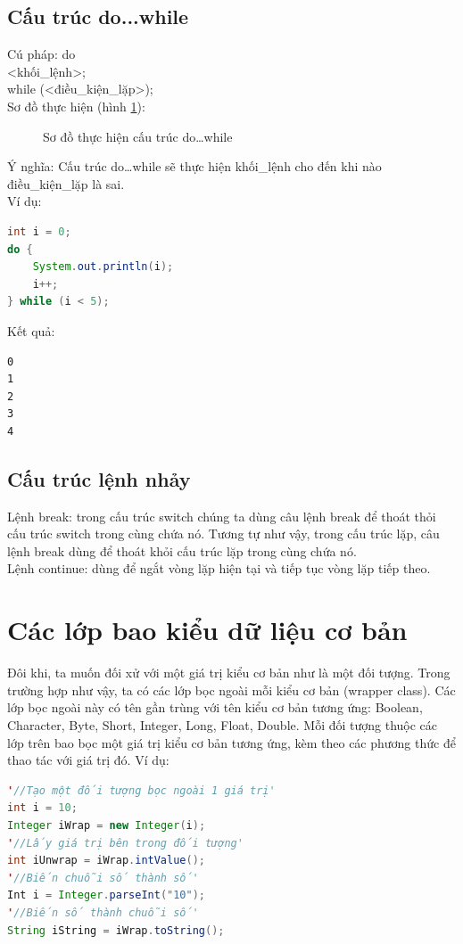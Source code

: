 \subsection{Cấu trúc do...while}
\indent Cú pháp:
{\ttfamily
do {\\
\indent <khối\_lệnh>;\\
} while (<điều\_kiện\_lặp>);}\\

\indent Sơ đồ thực hiện (hình \ref{hinh16}):
\begin{figure}[!ht]
\centering

\caption{Sơ đồ thực hiện cấu trúc do…while}\label{hinh16} 
\end{figure}

\indent Ý nghĩa: Cấu trúc {\ttfamily do…while} sẽ thực hiện {\ttfamily khối\_lệnh} cho đến khi nào {\ttfamily điều\_kiện\_lặp} là sai.\\
\indent Ví dụ:\\

\begin{lstlisting}[escapechar=!,language=java]	
int i = 0;
do {
	System.out.println(i);
	i++;
} while (i < 5);
\end{lstlisting}

\indent Kết quả:
\begin{verbatim}
0
1
2
3
4
\end{verbatim}
\subsection{Cấu trúc lệnh nhảy}
\indent Lệnh break: trong cấu trúc switch chúng ta dùng câu lệnh break để thoát thỏi cấu trúc switch trong cùng chứa nó. Tương tự như vậy, trong cấu trúc lặp, câu lệnh break dùng để thoát khỏi cấu trúc lặp trong cùng chứa nó. \\
\indent Lệnh continue: dùng để ngắt vòng lặp hiện tại và tiếp tục vòng lặp tiếp theo.
\section{Các lớp bao kiểu dữ liệu cơ bản}
\indent Đôi khi, ta muốn đối xử với một giá trị kiểu cơ bản như là một đối tượng. Trong trường hợp như vậy, ta có các lớp bọc ngoài mỗi kiểu cơ bản (wrapper class). Các lớp bọc ngoài này có tên gần trùng với tên kiểu cơ bản tương ứng: {\ttfamily Boolean, Character, Byte, Short, Integer, Long, Float, Double}. Mỗi đối tượng thuộc các lớp trên bao bọc một giá trị kiểu cơ bản tương ứng, kèm theo các phương thức để thao tác với giá trị đó. Ví dụ:
\begin{lstlisting}[escapechar=',language=java]	
'//Tạo một đối tượng bọc ngoài 1 giá trị'
int i = 10;
Integer iWrap = new Integer(i);
'//Lấy giá trị bên trong đối tượng'
int iUnwrap = iWrap.intValue();
'//Biến chuỗi số thành số'
Int i = Integer.parseInt("10");
'//Biến số thành chuỗi số'
String iString = iWrap.toString();
\end{lstlisting}

